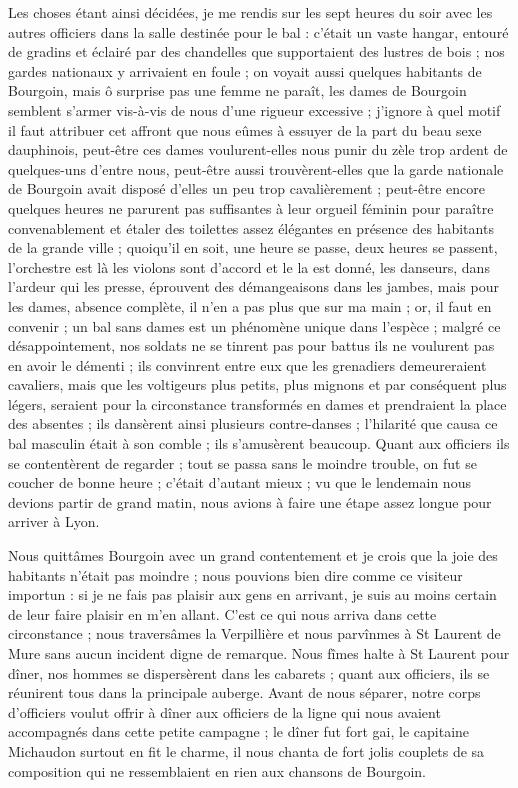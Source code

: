 \documentclass[11pt,a4paper]{report}
\begin{document}
Les choses étant ainsi décidées, je me rendis sur les sept heures du soir avec les autres officiers dans la salle destinée pour le bal : c'était un vaste hangar, entouré de gradins et éclairé par des chandelles que supportaient des lustres de bois ; nos gardes nationaux y arrivaient en foule ; on voyait aussi quelques habitants de Bourgoin, mais ô surprise pas une femme ne paraît, les dames de Bourgoin semblent s'armer vis-à-vis de nous d'une rigueur excessive ; j'ignore à quel motif il faut attribuer cet affront que nous eûmes à essuyer de la part du beau sexe dauphinois, peut-être ces dames voulurent-elles nous punir du zèle trop ardent de quelques-uns d'entre nous, peut-être aussi trouvèrent-elles que la garde nationale de Bourgoin avait disposé d'elles un peu trop cavalièrement ; peut-être encore quelques heures ne parurent pas suffisantes à leur orgueil féminin pour paraître convenablement et étaler des toilettes assez élégantes en présence des habitants de la grande ville ; quoiqu'il en soit, une heure se passe, deux heures se passent, l'orchestre est là les violons sont d'accord et le la est donné, les danseurs, dans l'ardeur qui les presse, éprouvent des démangeaisons dans les jambes, mais pour les dames, absence complète, il n'en a pas plus que sur ma main ; or, il faut en convenir ; un bal sans dames est un phénomène unique dans l'espèce ; malgré ce désappointement, nos soldats ne se tinrent pas pour battus ils ne voulurent pas en avoir le démenti ; ils convinrent entre eux que les grenadiers demeureraient cavaliers, mais que les voltigeurs plus petits, plus mignons et par conséquent plus légers, seraient pour la circonstance transformés en dames et prendraient la place des absentes ; ils dansèrent ainsi plusieurs contre-danses ; l'hilarité que causa ce bal masculin était à son comble ; ils s'amusèrent beaucoup. Quant aux officiers ils se contentèrent de regarder ; tout se passa sans le moindre trouble, on fut se coucher de bonne heure ; c'était d'autant mieux ; vu que le lendemain nous devions partir de grand matin, nous avions à faire une étape assez longue pour arriver à Lyon.

Nous quittâmes Bourgoin avec un grand contentement et je crois que la joie des habitants n'était pas moindre ; nous pouvions bien dire comme ce visiteur importun : si je ne fais pas plaisir aux gens en arrivant, je suis au moins certain de leur faire plaisir en m'en allant. C'est ce qui nous arriva dans cette circonstance ; nous traversâmes la Verpillière et nous parvînmes à St Laurent de Mure sans aucun incident digne de remarque. Nous fîmes halte à St Laurent pour dîner, nos hommes se dispersèrent dans les cabarets ; quant aux officiers, ils se réunirent tous dans la principale auberge. Avant de nous séparer, notre corps d'officiers voulut offrir à dîner aux officiers de la ligne qui nous avaient accompagnés dans cette petite campagne ; le dîner fut fort gai, le capitaine Michaudon surtout en fit le charme, il nous chanta de fort jolis couplets de sa composition qui ne ressemblaient en rien aux chansons de Bourgoin.
\end{document}
